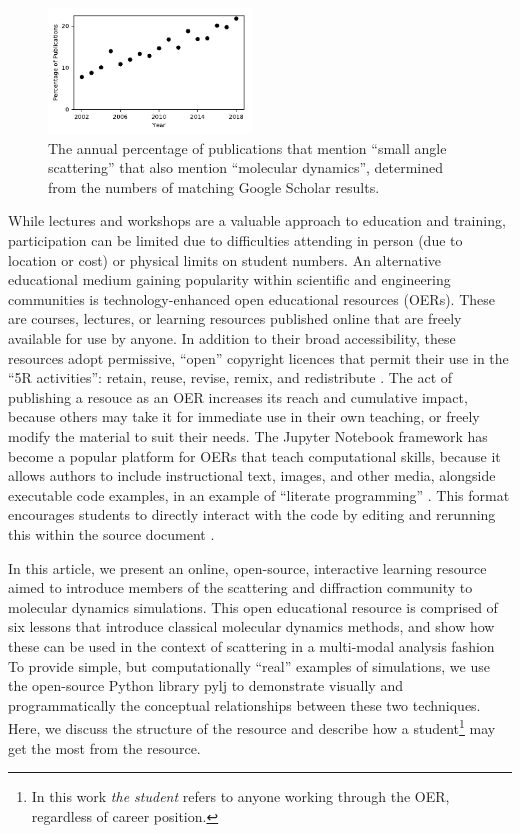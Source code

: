 \documentclass[amsmath,amssymb,twocolumn,superscriptaddress]{revtex4-1}
\begin{document}
%
\begin{figure}
\label{fig:growth}
\includegraphics[width=0.48\textwidth]{figures/chem_data_py.pdf}
\caption{The annual percentage of publications that mention ``small angle scattering'' that also mention ``molecular dynamics'', determined from the numbers of matching Google Scholar results.}
\end{figure}
%

While lectures and workshops are a valuable approach to education and training, participation can be limited due to difficulties attending in person (due to location or cost) or physical limits on student numbers.
An alternative educational medium gaining popularity within scientific and engineering communities is technology-enhanced open educational resources (OERs).
These are courses, lectures, or learning resources published online that are freely available for use by anyone. In addition to their broad accessibility, these resources adopt permissive, ``open'' copyright licences that permit their use in the ``5R activities'': retain, reuse, revise, remix, and redistribute \cite{wiley_open_2018}.
The act of publishing a resouce as an OER increases its reach and cumulative impact, because others may take it for immediate use in their own teaching, or freely modify the material to suit their needs.
The Jupyter Notebook framework \cite{kluyver_jupyter_2016} has become a popular platform for OERs that teach computational skills, because it allows authors to include instructional text, images, and other media, alongside executable code examples, in an example of ``literate programming'' \cite{knuth_literate_1984}.
This format encourages students to directly interact with the code by editing and rerunning this within the source document \cite{barba_cybertraining_2017}.

In this article, we present an online, open-source, interactive learning resource aimed to introduce members of the scattering and diffraction community to molecular dynamics simulations.
This open educational resource is comprised of six lessons that introduce classical molecular dynamics methods, and show how these can be used in the context of scattering in a multi-modal analysis fashion
To provide simple, but computationally ``real'' examples of simulations, we use the open-source Python library pylj \cite{mccluskey_pylj_2018} to demonstrate visually and programmatically the conceptual relationships between these two techniques.
Here, we discuss the structure of the resource and describe how a student\footnote{In this work \emph{the student} refers to anyone working through the OER, regardless of career position.} may get the most from the resource.
\end{document}
